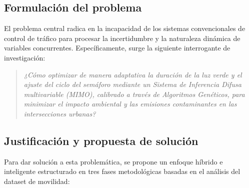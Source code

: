 \documentclass[12pt,a4paper]{article}
\begin{document}
\subsection{Formulación del problema}

El problema central radica en la incapacidad de los sistemas convencionales
de control de tráfico para procesar la incertidumbre y la naturaleza
dinámica de variables concurrentes. Específicamente, surge la siguiente
interrogante de investigación:

\begin{quote}
\textit{¿Cómo optimizar de manera adaptativa la duración de la luz verde y
el ajuste del ciclo del semáforo mediante un Sistema de Inferencia Difusa
multivariable (MIMO), calibrado a través de Algoritmos Genéticos, para
minimizar el impacto ambiental y las emisiones contaminantes en las
intersecciones urbanas?}
\end{quote}

\subsection{Justificación y propuesta de solución}

Para dar solución a esta problemática, se propone un enfoque híbrido e
inteligente estructurado en tres fases metodológicas basadas en el
análisis del dataset de movilidad:
\end{document}
